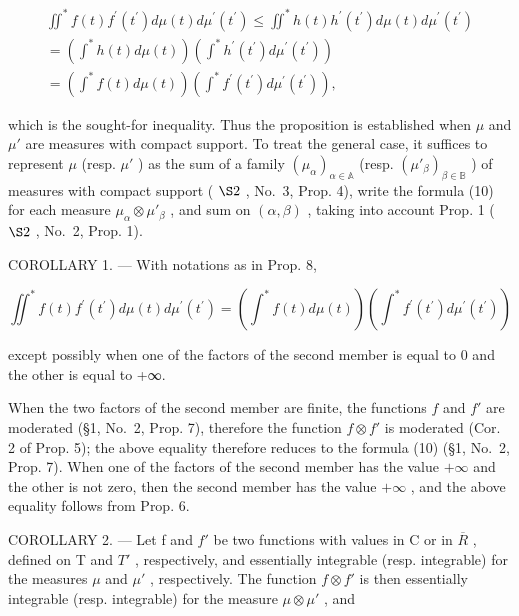 \[
\begin{array}{l} \iint^ {*} f (t) f ^ {\prime} (t ^ {\prime}) d \mu (t) d \mu^ {\prime} (t ^ {\prime}) \leqslant \iint^ {*} h (t) h ^ {\prime} (t ^ {\prime}) d \mu (t) d \mu^ {\prime} (t ^ {\prime}) \\ = \left(\int^ {*} h (t) d \mu (t)\right) \left(\int^ {*} h ^ {\prime} (t ^ {\prime}) d \mu^ {\prime} (t ^ {\prime})\right) \\ = \left(\int^ {*} f (t) d \mu (t)\right) \left(\int^ {*} f ^ {\prime} (t ^ {\prime}) d \mu^ {\prime} (t ^ {\prime})\right), \end{array}
\]

which is the sought-for inequality. Thus the proposition is established when \(\mu\) and \(\mu'\) are measures with compact support. To treat the general case, it suffices to represent \(\mu\) (resp. \(\mu'\) ) as the sum of a family \((\mu_{\alpha})_{\alpha\in\mathbb{A}}\) (resp. \((\mu'_{\beta})_{\beta\in\mathbb{B}}\) ) of measures with compact support ( \(\S2\) , No.~3, Prop. 4), write the formula (10) for each measure \(\mu_{\alpha}\otimes\mu'_{\beta}\) , and sum on \((\alpha,\beta)\) , taking into account Prop. 1 ( \(\S2\) , No.~2, Prop. 1).

COROLLARY 1. --- With notations as in Prop. 8,

\[
\iint^ {*} f (t) f ^ {\prime} \left(t ^ {\prime}\right) d \mu (t) d \mu^ {\prime} \left(t ^ {\prime}\right) = \left(\int^ {*} f (t) d \mu (t)\right) \left(\int^ {*} f ^ {\prime} \left(t ^ {\prime}\right) d \mu^ {\prime} \left(t ^ {\prime}\right)\right)\tag{11}
\]

except possibly when one of the factors of the second member is equal to 0 and the other is equal to +∞.

When the two factors of the second member are finite, the functions \(f\) and \(f'\) are moderated (§1, No.~2, Prop. 7), therefore the function \(f \otimes f'\) is moderated (Cor. 2 of Prop. 5); the above equality therefore reduces to the formula (10) (§1, No.~2, Prop. 7). When one of the factors of the second member has the value \(+\infty\) and the other is not zero, then the second member has the value \(+\infty\) , and the above equality follows from Prop. 6.

COROLLARY 2. --- Let f and \(f'\) be two functions with values in C or in \(\overline{R}\) , defined on T and \(T'\) , respectively, and essentially integrable (resp. integrable) for the measures \(\mu\) and \(\mu'\) , respectively. The function \(f \otimes f'\) is then essentially integrable (resp. integrable) for the measure \(\mu \otimes \mu'\) , and

